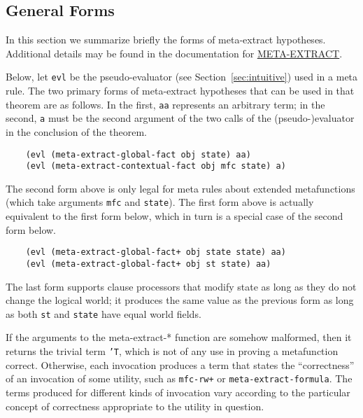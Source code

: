 \subsection{General Forms}
\label{sec:general}

In this section we summarize briefly the forms of meta-extract
hypotheses.  Additional details may be found in the documentation for
\href{http://www.cs.utexas.edu/users/moore/acl2/manuals/current/manual/index.html?topic=ACL2\_\_\_\_META-EXTRACT}{\underline{META-EXTRACT}}.

Below, let {\tt evl} be the pseudo-evaluator (see
Section~\ref{sec:intuitive}) used in a meta rule.  The two primary
forms of meta-extract hypotheses that can be used in that theorem are
as follows.  In the first, {\tt aa} represents an arbitrary term; in
the second, {\tt a} must be the second argument of the two calls of
the (pseudo-)evaluator in the conclusion of the theorem.

\begin{verbatim}
    (evl (meta-extract-global-fact obj state) aa)
    (evl (meta-extract-contextual-fact obj mfc state) a)
\end{verbatim}

The second form above is only legal for meta rules about extended
metafunctions (which take arguments {\tt mfc} and {\tt state}).  The
first form above is actually equivalent to the first form below, which
in turn is a special case of the second form below.

\begin{verbatim}
    (evl (meta-extract-global-fact+ obj state state) aa)
    (evl (meta-extract-global-fact+ obj st state) aa)
\end{verbatim}

The last form supports clause processors that modify state as long as
they do not change the logical world; it produces the same value as
the previous form as long as both {\tt st} and {\tt state} have equal
world fields.

If the arguments to the meta-extract-* function are somehow malformed,
then it returns the trivial term {\tt 'T}, which is not of any use in
proving a metafunction correct.  Otherwise, each invocation produces a
term that states the ``correctness'' of an invocation of some
utility, such as {\tt mfc-rw+} or {\tt meta-\allowbreak{}extract-\allowbreak{}formula}.  The
terms produced for different kinds of invocation vary according to the
particular concept of correctness appropriate to the utility in
question.


